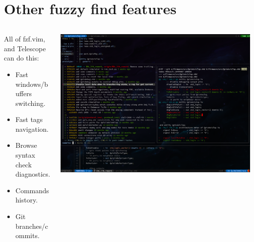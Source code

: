\documentclass[aspectratio=169]{beamer}
\begin{document}
\section*{Other fuzzy find features}
\begin{frame}{\secname}
  \begin{columns}
    \begin{column}{0.5\textwidth}
      All of fzf.vim, and Telescope can do this: 
      \begin{itemize}
        \item Fast windows/buffers switching. 
        \item Fast tags navigation. 
        \item Browse syntax check diagnostics. 
        \item Commands history. 
        \item Git branches/commits.
      \end{itemize}
    \end{column}
    \begin{column}{0.6\textwidth}
      \includegraphics[width=1.0\textwidth]{figs/git_fzf_commits.png}
      
    \end{column}
  \end{columns}
  	
\end{frame}


\end{document}
